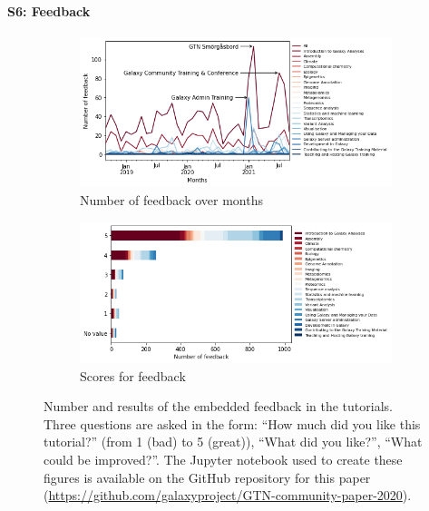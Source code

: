 \documentclass[10pt,letterpaper]{article}
\begin{document}
\paragraph{S6: Feedback}
\begin{figure}[!ht]
	\centering
	\begin{subfigure}[b]{0.7\textwidth}
         \centering
         \includegraphics[width=\textwidth]{images/feedback.png}
         \caption{Number of feedback over months}
         \label{fig:feedback-}
    \end{subfigure}
    \hfill
    \begin{subfigure}[b]{0.7\textwidth}
         \centering
         \includegraphics[width=\textwidth]{images/feedback-scores.png}
         \caption{Scores for feedback}
         \label{fig:feedback-scores}
    \end{subfigure}
	\caption{Number and results of the embedded feedback in the tutorials. Three questions are asked in the form: ``How much did you like this tutorial?'' (from 1 (bad) to 5 (great)), ``What did you like?'', ``What could be improved?''. The Jupyter notebook used to create these figures is available on the GitHub repository for this paper (\url{https://github.com/galaxyproject/GTN-community-paper-2020}).
    \label{fig:feedback}}
\end{figure}
\end{document}
